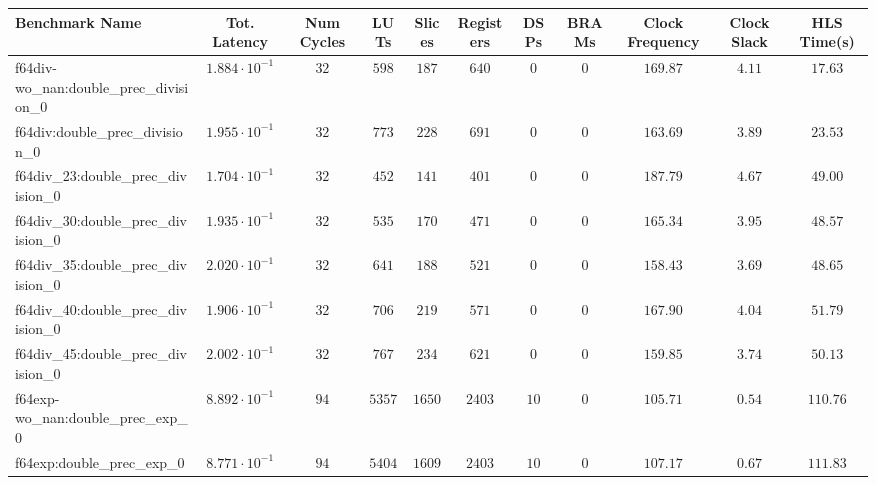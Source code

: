 \begin{tabular}{|l|c|c|c|c|c|c|c|c|c|c|}
\hline
Benchmark Name                                 & Tot. Latency            & Num Cycles & LUTs       & Slices    & Registers & DSPs    & BRAMs & Clock Frequency & Clock Slack & HLS Time(s) \\
\hline
f64div-wo\_nan:double\_prec\_division\_0       & $ 1.884 \cdot 10^{-1} $ & $ 32     $ & $ 598    $ & $ 187   $ & $ 640   $ & $ 0   $ & $ 0 $ & $ 169.87      $ & $ 4.11    $ & $ 17.63   $ \\
f64div:double\_prec\_division\_0               & $ 1.955 \cdot 10^{-1} $ & $ 32     $ & $ 773    $ & $ 228   $ & $ 691   $ & $ 0   $ & $ 0 $ & $ 163.69      $ & $ 3.89    $ & $ 23.53   $ \\
f64div\_23:double\_prec\_division\_0           & $ 1.704 \cdot 10^{-1} $ & $ 32     $ & $ 452    $ & $ 141   $ & $ 401   $ & $ 0   $ & $ 0 $ & $ 187.79      $ & $ 4.67    $ & $ 49.00   $ \\
f64div\_30:double\_prec\_division\_0           & $ 1.935 \cdot 10^{-1} $ & $ 32     $ & $ 535    $ & $ 170   $ & $ 471   $ & $ 0   $ & $ 0 $ & $ 165.34      $ & $ 3.95    $ & $ 48.57   $ \\
f64div\_35:double\_prec\_division\_0           & $ 2.020 \cdot 10^{-1} $ & $ 32     $ & $ 641    $ & $ 188   $ & $ 521   $ & $ 0   $ & $ 0 $ & $ 158.43      $ & $ 3.69    $ & $ 48.65   $ \\
f64div\_40:double\_prec\_division\_0           & $ 1.906 \cdot 10^{-1} $ & $ 32     $ & $ 706    $ & $ 219   $ & $ 571   $ & $ 0   $ & $ 0 $ & $ 167.90      $ & $ 4.04    $ & $ 51.79   $ \\
f64div\_45:double\_prec\_division\_0           & $ 2.002 \cdot 10^{-1} $ & $ 32     $ & $ 767    $ & $ 234   $ & $ 621   $ & $ 0   $ & $ 0 $ & $ 159.85      $ & $ 3.74    $ & $ 50.13   $ \\
f64exp-wo\_nan:double\_prec\_exp\_0            & $ 8.892 \cdot 10^{-1} $ & $ 94     $ & $ 5357   $ & $ 1650  $ & $ 2403  $ & $ 10  $ & $ 0 $ & $ 105.71      $ & $ 0.54    $ & $ 110.76  $ \\
f64exp:double\_prec\_exp\_0                    & $ 8.771 \cdot 10^{-1} $ & $ 94     $ & $ 5404   $ & $ 1609  $ & $ 2403  $ & $ 10  $ & $ 0 $ & $ 107.17      $ & $ 0.67    $ & $ 111.83  $ \\

\end{tabular}

